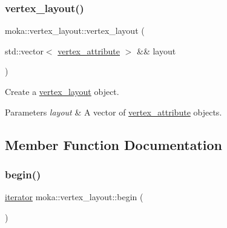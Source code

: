 \subsubsection{\texorpdfstring{vertex\_layout()}{vertex\_layout()}\hspace{0.1cm}{\footnotesize\ttfamily [3/3]}}
{\footnotesize\ttfamily moka\+::vertex\+\_\+layout\+::vertex\+\_\+layout (\begin{DoxyParamCaption}\item[{std\+::vector$<$ \mbox{\hyperlink{structmoka_1_1vertex__attribute}{vertex\+\_\+attribute}} $>$ \&\&}]{layout }\end{DoxyParamCaption})\hspace{0.3cm}{\ttfamily [explicit]}}



Create a \mbox{\hyperlink{classmoka_1_1vertex__layout}{vertex\+\_\+layout}} object. 


\begin{DoxyParams}{Parameters}
{\em layout} & A vector of \mbox{\hyperlink{structmoka_1_1vertex__attribute}{vertex\+\_\+attribute}} objects. \\
\hline
\end{DoxyParams}


\subsection{Member Function Documentation}
\mbox{\label{classmoka_1_1vertex__layout_a4b36db21d5660940650759fc91b5697a}} 
\subsubsection{\texorpdfstring{begin()}{begin()}\hspace{0.1cm}{\footnotesize\ttfamily [1/2]}}
{\footnotesize\ttfamily \mbox{\hyperlink{classmoka_1_1vertex__layout_ae9f116229b2836d428a9d39d41028058}{iterator}} moka\+::vertex\+\_\+layout\+::begin (\begin{DoxyParamCaption}{ }\end{DoxyParamCaption})\hspace{0.3cm}{\ttfamily [noexcept]}}

\mbox{\label{classmoka_1_1vertex__layout_aec84dfcd503dfa8546ecb32c443ac1b0}} 
